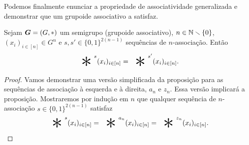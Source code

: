 Podemos finalmente enunciar a propriedade de associatividade generalizada e demonstrar que um grupoide associativo a satisfaz.

\begin{proposition}
Sejam $\bm G=(G,\ast)$ um semigrupo (grupoide associativo), $n \in \mathbb{N} \smallsetminus \{0\}$, $(x_i)_{i \in [n]} \in G^n$ e $s,s' \in \{0,1\}^{2(n-1)}$ sequências de $n$-associação. Então
	\begin{equation*}
	\bigopb\nolimits^{s} (x_i)_{i \in [n]} = \bigopb\nolimits^{s'} (x_i)_{i \in [n]}.
	\end{equation*}
\end{proposition}
\begin{proof}
Vamos demonstrar uma versão simplificada da proposição para as sequências de associação à esquerda e à direita, $a_n$ e $z_n$. Essa versão implicará a proposição. Mostraremos por indução em $n$ que qualquer sequência de $n$-associação $s \in \{0,1\}^{2(n-1)}$ satisfaz
	\begin{equation}
	\label{eq:sequencia.associacao.inducao}
	\bigopb\nolimits^{s} (x_i)_{i \in [n]} = \bigopb\nolimits^{a_n} (x_i)_{i \in [n]} = \bigopb\nolimits^{z_n} (x_i)_{i \in [n]}.
	\end{equation}


\end{proof}
